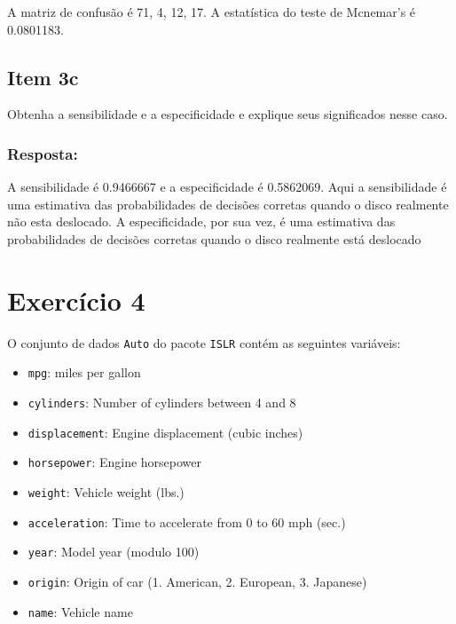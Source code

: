 \documentclass[
]{article}
\newenvironment{Shaded}{\begin{snugshade}}{\end{snugshade}}
\newcommand{\DecValTok}[1]{\textcolor[rgb]{0.00,0.00,0.81}{#1}}
\newcommand{\NormalTok}[1]{#1}
\newcommand{\OtherTok}[1]{\textcolor[rgb]{0.56,0.35,0.01}{#1}}
\newcommand{\SpecialCharTok}[1]{\textcolor[rgb]{0.00,0.00,0.00}{#1}}
\begin{document}
A matriz de confusão é 71, 4, 12, 17. A estatística do teste de
Mcnemar's é 0.0801183.

\hypertarget{item-3c}{%
\subsection{Item 3c}\label{item-3c}}

Obtenha a sensibilidade e a especificidade e explique seus significados
nesse caso.

\hypertarget{resposta-5}{%
\subsubsection{Resposta:}\label{resposta-5}}

\begin{Shaded}
\end{Shaded}

A sensibilidade é 0.9466667 e a especificidade é 0.5862069. Aqui a
sensibilidade é uma estimativa das probabilidades de decisões corretas
quando o disco realmente não esta deslocado. A especificidade, por sua
vez, é uma estimativa das probabilidades de decisões corretas quando o
disco realmente está deslocado

\hypertarget{exercuxedcio-4}{%
\section{Exercício 4}\label{exercuxedcio-4}}

O conjunto de dados \texttt{Auto} do pacote \texttt{ISLR} contém as
seguintes variáveis:

\begin{itemize}
\item
  \texttt{mpg}: miles per gallon
\item
  \texttt{cylinders}: Number of cylinders between 4 and 8
\item
  \texttt{displacement}: Engine displacement (cubic inches)
\item
  \texttt{horsepower}: Engine horsepower
\item
  \texttt{weight}: Vehicle weight (lbs.)
\item
  \texttt{acceleration}: Time to accelerate from 0 to 60 mph (sec.)
\item
  \texttt{year}: Model year (modulo 100)
\item
  \texttt{origin}: Origin of car (1. American, 2. European, 3. Japanese)
\item
  \texttt{name}: Vehicle name
\end{itemize}
\end{document}
